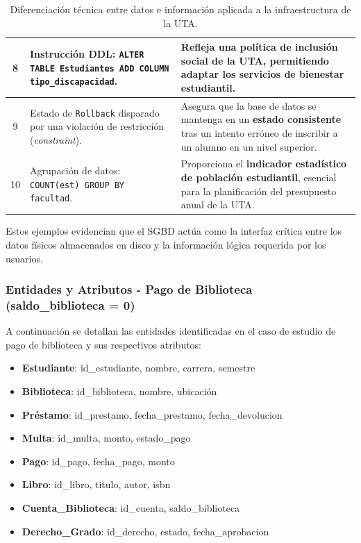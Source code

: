 \documentclass{article}
\begin{document}
\begin{table}[H]
\begin{tabular}{|c|p{5cm}|p{8cm}|}
8  & Instrucción DDL: \texttt{ALTER TABLE Estudiantes ADD COLUMN tipo\_discapacidad}. & Refleja una \textbf{política de inclusión social} de la UTA, permitiendo adaptar los servicios de bienestar estudiantil. \\ \hline
9  & Estado de \texttt{Rollback} disparado por una violación de restricción (\textit{constraint}). & Asegura que la base de datos se mantenga en un \textbf{estado consistente} tras un intento erróneo de inscribir a un alumno en un nivel superior. \\ \hline
10 & Agrupación de datos: \texttt{COUNT(est) GROUP BY facultad}. & Proporciona el \textbf{indicador estadístico de población estudiantil}, esencial para la planificación del presupuesto anual de la UTA. \\ \hline
\end{tabular}
\caption{Diferenciación técnica entre datos e información aplicada a la infraestructura de la UTA.}
\end{table}



Estos ejemplos evidencian que el SGBD actúa como la interfaz crítica entre los datos físicos almacenados en disco y la información lógica requerida por los usuarios.

\subsubsection{Entidades y Atributos - Pago de Biblioteca (saldo\_biblioteca = 0)}

A continuación se detallan las entidades identificadas en el caso de estudio de pago de biblioteca y sus respectivos atributos:

\begin{itemize}
    \item \textbf{Estudiante}: id\_estudiante, nombre, carrera, semestre
    \item \textbf{Biblioteca}: id\_biblioteca, nombre, ubicación
    \item \textbf{Préstamo}: id\_prestamo, fecha\_prestamo, fecha\_devolucion
    \item \textbf{Multa}: id\_multa, monto, estado\_pago
    \item \textbf{Pago}: id\_pago, fecha\_pago, monto
    \item \textbf{Libro}: id\_libro, titulo, autor, isbn
    \item \textbf{Cuenta\_Biblioteca}: id\_cuenta, saldo\_biblioteca
    \item \textbf{Derecho\_Grado}: id\_derecho, estado, fecha\_aprobacion
\end{itemize}
\end{document}
